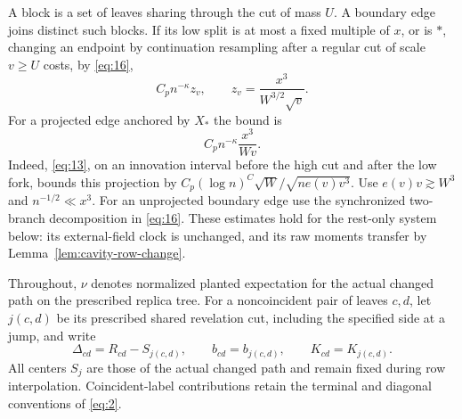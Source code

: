 A block is a set of leaves sharing through the cut of mass \(U\).
A boundary edge joins distinct such blocks. If its low split is at
most a fixed multiple of \(x\), or is \(*\), changing an endpoint
by continuation resampling after a regular cut of scale \(v\ge U\)
costs, by \eqref{eq:16},
\[
 C_p n^{-\kappa}z_v,\qquad z_v=\frac{x^3}{W^{3/2}\sqrt v}.
\]
For a projected edge anchored by \(X_*\) the bound is
\[
                         C_p n^{-\kappa}\frac{x^3}{Wv}.
\]
Indeed, \eqref{eq:13}, on an innovation interval before the high
cut and after the low fork, bounds this projection by
\(C_p(\log n)^C\sqrt W/\sqrt{n e(v)v^3}\).
Use \(e(v)v\gtrsim W^3\) and \(n^{-1/2}\ll x^3\).
For an unprojected boundary edge use the synchronized two-branch
decomposition in \eqref{eq:16}. These estimates hold for the
rest-only system below: its external-field clock is unchanged,
and its raw moments transfer by Lemma~\ref{lem:cavity-row-change}.

Throughout, \(\nu\) denotes normalized planted expectation for the
actual changed path on the prescribed replica tree. For a noncoincident
pair of leaves \(c,d\), let \(j(c,d)\) be its prescribed shared
revelation cut, including the specified side at a jump, and write
\[
 \Delta_{cd}=R_{cd}-S_{j(c,d)},\qquad
 b_{cd}=b_{j(c,d)},\qquad K_{cd}=K_{j(c,d)}.
\]
All centers \(S_j\) are those of the actual changed path and remain
fixed during row interpolation. Coincident-label contributions retain
the terminal and diagonal conventions of \eqref{eq:2}.

